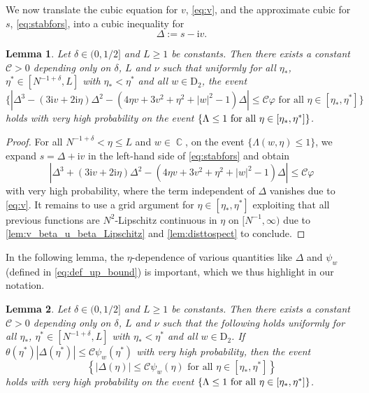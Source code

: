 \documentclass[10pt,a4paper]{amsart}
\DeclareMathOperator{\CC}{\mathbb{C}}
\newcommand{\ii}{\mathrm{i}}
\newcommand{\abs}[1]{\left| #1 \right|}
\newtheorem{lemma}{Lemma}[section]
\numberwithin{equation}{section}
\newcommand{\nc}{\normalcolor}
\begin{document}
	We now translate the cubic equation for $v$, \eqref{eq:v}, and the approximate cubic for $s$, \eqref{eq:stabfors}, into a cubic inequality for
	\begin{equation*}
		\Delta := s- \ii v.
	\end{equation*} 
	\begin{lemma}\label{lem:3rddegeqonDelta}
		Let $\delta \in (0,1/2]$ and $L \geq 1$ be constants. Then there exists a constant $\mathcal C >0$ depending only on $\delta$, $L$ and $\nu$ such that uniformly for all $\eta_*$, $\eta^* \in [N^{-1+\delta},L]$ with $\eta_* < \eta^*$ and all $w \in \mathrm{D}_2$, the 
		event 
		\[ 
		\{ |\Delta^3 - ( 3 \ii v + 2 \ii \eta)\Delta^2 - (4 \eta v + 3 v^2 + \eta^2 + \abs{w}^2 -1) \Delta| \leq \mathcal C {\varphi} \text{ for all } \eta \in [\eta_*,\eta^*] 
		\}
		\] 
		holds with very high probability on the event $\{  \Lambda \leq 1 \nc  \text{ for all } \eta \in [\eta_*, \eta^*]\}$. 
	\end{lemma} 
	\begin{proof}
		For all $ N^{-1+ \delta} < \eta \le L$ and $w \in \CC$, on the event $\{  \Lambda(w,\eta) \leq 1  \}$, we expand $s =  \Delta + \ii v $ in the left-hand side of \eqref{eq:stabfors}
		and obtain 
		\[ 
		|\Delta^3 + ( 3 \ii v + 2 \ii \eta)\Delta^2 - (4 \eta v + 3 v^2 + \eta^2 + \abs{w}^2 -1) \Delta| \leq \mathcal C { \varphi}
		\] 
		with very high probability, 
		where the term independent of $\Delta$ vanishes due to \eqref{eq:v}. It remains to use a grid argument for $\eta \in [\eta_\ast, \eta^\ast]$ exploiting that all previous functions are $N^{2}$-Lipschitz continuous in $\eta$ on $[N^{-1},\infty)$ due to \cref{lem:v_beta_u_beta_Lipschitz} and \cref{lem:disttospect} to conclude.
	\end{proof}
	
	
	
	
	
	
	
	In the following lemma, the $\eta$-dependence of various quantities like $\Delta$ and $\psi_w$ (defined in \eqref{eq:def_up_bound}) is important, which we thus highlight in our notation. 
	\begin{lemma}\label{lem:Deltasmall}
		Let $\delta \in (0,1/2]$ and $L \geq 1$ be constants. Then there exists a constant $\mathcal C >0$ depending only on $\delta$, $L$ and $\nu$ such that the following holds uniformly for all $\eta_*$, $\eta^* \in [N^{-1+\delta},L]$ with $\eta_* < \eta^*$ and all $w \in \mathrm{D}_2$. If 
		$\theta (\eta^\ast) |\Delta(\eta^{\ast})| \leq \mathcal C \psi_w(\eta^\ast)$
		with very high probability, then the event
		\[ 
		\left\{ |\Delta(\eta)| \leq \mathcal C \psi_w(\eta)  \text{ for all } \eta \in [\eta_*,\eta^*] 
		\right\}
		\] 
		holds with very high probability on the event $\{  \Lambda \leq 1 \nc  \text{ for all } \eta \in [\eta_*, \eta^*]\}$. 
	\end{lemma}
	
\end{document}
